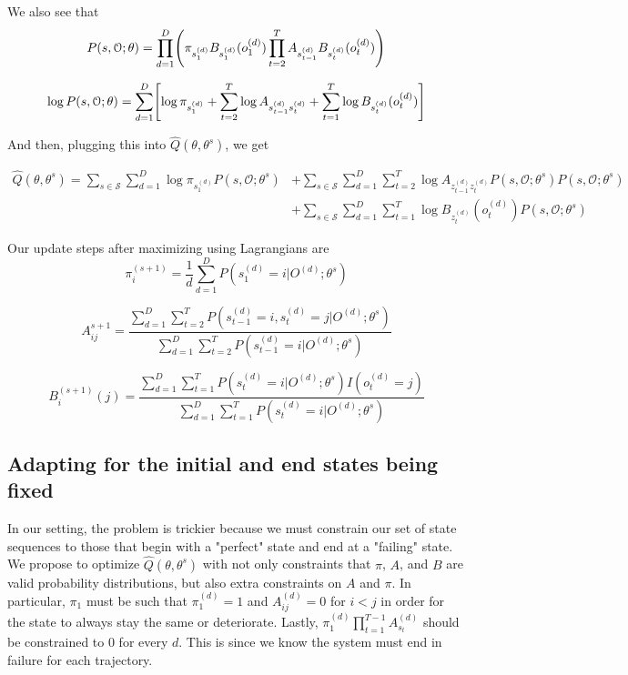 \documentclass[english]{article}
\numberwithin{equation}{section}
\DeclarePairedDelimiter\paren{(}{)}           %
\DeclarePairedDelimiter\bkt{[}{]}             %
\begin{document}
	We also see that
	$$P(s,\mathcal{O};\theta) = \prod_{d=1}^D \paren*{\pi_{s_1^{(d)}}B_{s_1^{(d)}}(o_1^{(d)}) \prod_{t=2}^T A_{s_{t-1}^{(d)}}B_{s_t^{(d)}}(o_t^{(d)})}$$
	
	$$
	\log P(s,\mathcal{O};\theta)=\sum_{d=1}^D \bkt*{\log \pi_{s_1^{(d)}} + \sum_{t=2}^T \log A_{s_{t-1}^{(d)}s_t^{(d)}} + \sum_{t=1}^T \log B_{s_t^{(d)}}(o_t^{(d)})}
	$$
	
	And then, plugging this into $\hat{Q}(\theta,\theta^s)$, we get
	
	\begin{align*}
	\hat{Q}(\theta,\theta^s) = \sum_{s\in \mathcal{S}}\sum_{d=1}^{D} \log \pi_{s_1^{(d)}}P(s,\mathcal{O};\theta^s) &+ \sum_{s\in \mathcal{S}}\sum_{d=1}^{D}\sum_{t=2}^T \log A_{z_{t-1}^{(d)}z_t^{(d)}} P(s,\mathcal{O};\theta^s)P(s,\mathcal{O};\theta^s) \\
	&+ \sum_{s\in \mathcal{S}}\sum_{d=1}^{D}\sum_{t=1}^T \log B_{z_t^{(d)}}(o_t^{(d)})P(s,\mathcal{O};\theta^s)
	\end{align*}
	
	Our update steps after maximizing using Lagrangians are
	$$\pi_i^{(s+1)} = \frac{1}{d}\sum_{d=1}^D P(s_1^{(d)}=i|O^{(d)};\theta^s)$$
	
	$$A_{ij}^{s+1} = \frac{\sum_{d=1}^D \sum_{t=2}^T P(s_{t-1}^{(d)}=i,s_t^{(d)}=j|O^{(d)};\theta^s)}{\sum_{d=1}^D \sum_{t=2}^T P(s_{t-1}^{(d)}=i|O^{(d)};\theta^s)}$$
	
	$$B_i^{(s+1)}(j) = \frac{\sum_{d=1}^D \sum_{t=1}^T P(s_{t}^{(d)}=i|O^{(d)};\theta^s)I(o_t^{(d)}=j)}{\sum_{d=1}^D \sum_{t=1}^T P(s_{t}^{(d)}=i|O^{(d)};\theta^s)}$$
	
	\subsection*{Adapting for the initial and end states being fixed}
	In our setting, the problem is trickier because we must constrain our set of state sequences to those that begin with a "perfect" state and end at a "failing" state. We propose to optimize $\hat{Q}(\theta,\theta^s)$ with not only constraints that $\pi$, $A$, and $B$ are valid probability distributions, but also extra constraints on $A$ and $\pi$. In particular, $\pi_1$ must be such that $\pi_1^{(d)} = 1$ and $A_{ij}^{(d)}=0$ for $i<j$ in order for the state to always stay the same or deteriorate. Lastly, $\pi_1^{(d)} \prod_{t=1}^{T-1} A^{(d)}_{s_t}$ should be constrained to $0$ for every $d$. This is since we know the system must end in failure for each trajectory.
	
\end{document}
